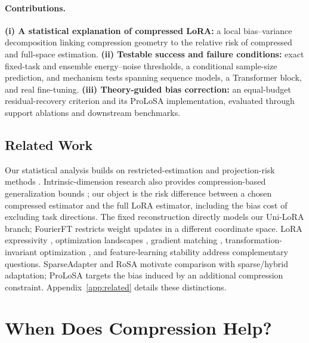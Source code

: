 \paragraph{Contributions.}
\textbf{(i) A statistical explanation of compressed LoRA:} a local bias--variance decomposition linking compression geometry to the relative risk of compressed and full-space estimation.
\textbf{(ii) Testable success and failure conditions:} exact fixed-task and ensemble energy--noise thresholds, a conditional sample-size prediction, and mechanism tests spanning sequence models, a Transformer block, and real fine-tuning.
\textbf{(iii) Theory-guided bias correction:} an equal-budget residual-recovery criterion and its ProLoSA implementation, evaluated through support ablations and downstream benchmarks.

\subsection{Related Work}
Our statistical analysis builds on restricted-estimation and projection-risk methods \citep{maillard2009compressed,kaban2014new,thanei2017random}. Intrinsic-dimension research also provides compression-based generalization bounds \citep{aghajanyan2021intrinsic}; our object is the risk difference between a chosen compressed estimator and the full LoRA estimator, including the bias cost of excluding task directions. The fixed reconstruction directly models our Uni-LoRA branch; FourierFT restricts weight updates in a different coordinate space. LoRA expressivity \citep{zeng2024expressive}, optimization landscapes \citep{liu2025landscape}, gradient matching \citep{wang2025lorapro}, transformation-invariant optimization \citep{yen2025lorarite}, and feature-learning stability \citep{wu2026stablelora} address complementary questions. SparseAdapter and RoSA \citep{he2022sparseadapter,nikdan2024rosa} motivate comparison with sparse/hybrid adaptation; ProLoSA targets the bias induced by an additional compression constraint. Appendix~\ref{app:related} details these distinctions.

\section{When Does Compression Help?}
\label{main:theory}
